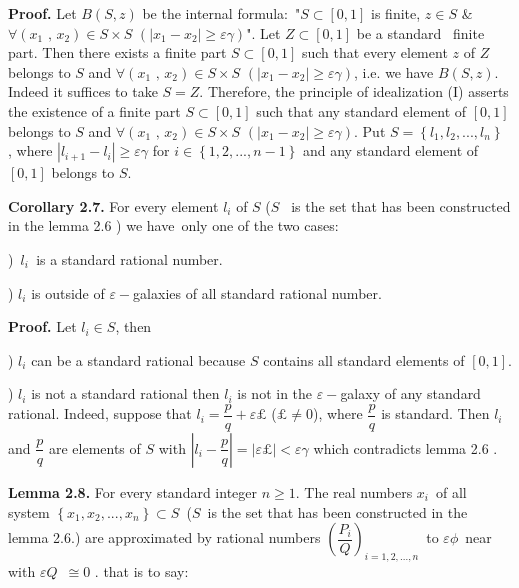 \documentclass[12pt]{article}
\begin{document}
\noindent \textbf{Proof.} Let $B\left( S,z\right) $ be the internal
formula:\ "$S\subset \left[ 0,1\right] $ is finite, $z\in S$ \& $\forall
\left( x_{1}\text{ , }x_{2}\right) \in S\times S$ $\left( \left\vert
x_{1}-x_{2}\right\vert \geq \varepsilon \gamma \right) $". Let $Z\subset %
\left[ 0,1\right] $ be a standard \ finite part. Then there exists a finite
part $S\subset \left[ 0,1\right] $ such that every element $z$ of $Z$
belongs to $S$ and $\forall \left( x_{1}\text{ , }x_{2}\right) \in S\times S$
$\left( \left\vert x_{1}-x_{2}\right\vert \geq \varepsilon \gamma \right) $,
i.e. we have $B\left( S,z\right) $. Indeed it suffices to take $S=Z$.
Therefore, the principle of idealization (I) asserts the existence of a
finite part $S\subset \left[ 0,1\right] $ such that any standard element of $%
\left[ 0,1\right] $ belongs to $S$ and $\forall \left( x_{1}\text{ , }%
x_{2}\right) \in S\times S$ $\left( \left\vert x_{1}-x_{2}\right\vert \geq
\varepsilon \gamma \right) $. Put $S=\left\{ l_{1},l_{2},...,l_{n}\right\} $%
, where $\left\vert l_{i+1}-l_{i}\right\vert \geq \varepsilon \gamma $ for $%
i\in \left\{ 1,2,...,n-1\right\} $ and any standard element of $\left[ 0,1%
\right] $ belongs to $S$.\newline

\noindent \textbf{Corollary 2.7.} For every element $l_{i}$ of $S$ ($S$%
\textit{\ }is the set that has been constructed in the lemma 2.6 ) we have\
only one of the two cases:

)\textit{\ }$l_{i}$\textit{\ }is a standard rational number.

) $l_{i}$ is outside of $\varepsilon -$galaxies of all standard
rational number.\newline

\noindent \textbf{Proof.} Let $l_{i}\in S$, then

) $l_{i}$ can be a standard rational because $S$ contains all
standard elements of $[0,1]$.

) $l_{i}$ is not a standard rational then $l_{i}$ is not in the $%
\varepsilon -$galaxy of any standard rational. Indeed, suppose that $l_{i}=%
\dfrac{p}{q}+\varepsilon \pounds $ ($\pounds \neq 0$), where $\dfrac{p}{q}$
is standard. Then $l_{i}$ and $\dfrac{p}{q}$ are elements of $S$ with $%
\left\vert l_{i}-\dfrac{p}{q}\right\vert =\left\vert \varepsilon \pounds %
\right\vert <\varepsilon \gamma $ which contradicts lemma 2.6 .\newline

\noindent \textbf{Lemma 2.8. }For every standard integer $n\geq 1$. The real
numbers $x_{i}$\ of all system $\left\{ x_{1},x_{2},...,x_{n}\right\}
\subset S$\ ($S$\ is the set that has been constructed in the lemma 2.6.)
are approximated by rational numbers $\left( \dfrac{P_{i}}{Q}\right)
_{i=1,2,...,n}$\ to $\varepsilon \phi $\ near with $\varepsilon Q$\ $\cong 0$%
. that is to say:
\end{document}
